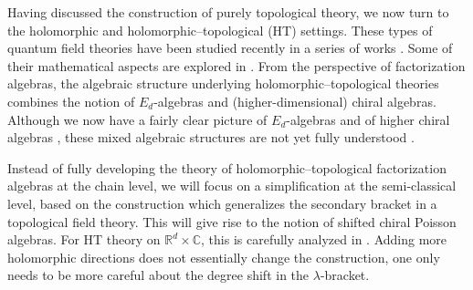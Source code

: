 \documentclass[11pt]{article}
\newcommand{\C}{\mathbb{C}}
\newcommand{\R}{\mathbb{R}}
\numberwithin{equation}{section}
\begin{document}
Having discussed the construction of purely topological theory, we now turn to the holomorphic and holomorphic--topological (HT) settings. These types of quantum field theories have been studied recently in a series of works \cite{budzik2024semi,Bomans:2023mkd,Gaiotto:2024gii}. Some of their mathematical aspects are explored in \cite{Wang:2024sqm,wang2024factorization}. From the perspective of factorization algebras, the algebraic structure underlying holomorphic--topological theories combines the notion of $E_d$-algebras and (higher-dimensional) chiral algebras. Although we now have a fairly clear picture of $E_d$-algebras and of higher chiral algebras \cite{Felder:2025bsz,Gui:2025dqp}, these mixed algebraic structures are not yet fully understood \cite{garner2025raviolo}.

Instead of fully developing the theory of holomorphic--topological factorization algebras at the chain level, we will focus on a simplification at the semi-classical level, based on the construction which generalizes the secondary bracket in a topological field theory. This will give rise to the notion of shifted chiral Poisson algebras. For HT theory on $\R^d\times \C$, this is carefully analyzed in \cite{Oh:2019mcg}. Adding more holomorphic directions does not essentially change the construction, one only needs to be more careful about the degree shift in the $\lambda$-bracket. 
\end{document}
